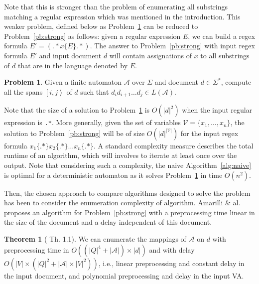 \documentclass[12px]{article}
\theoremstyle{definition}
\newtheorem{problem}{Problem}
\newtheorem{theorem}{Theorem}
\newcommand{\Span}[1]{\left[ #1 \right\rangle}
\begin{document}
      Note that this is stronger than the problem of enumerating all substrings
      matching a regular expression which was mentioned in the introduction.
      This weaker problem, defined below as Problem~\ref{pb:weak} can be
      reduced to Problem~\ref{pb:strong} as follows: given a regular expression
      $E$, we can build a regex formula $E' = ({.}* x\{E\} {.}*)$. The answer
      to Problem~\ref{pb:strong} with input regex formula $E'$ and input
      document $d$ will contain assignations of $x$ to all substrings of $d$
      that are in the language denoted by $E$.

      \begin{problem}%
        \label{pb:weak}
        Given a finite automaton $\mathcal{A}$ over $\Sigma$ and document $d
        \in \Sigma^*$, compute all the spans $\Span{i, j}$ of $d$ such that
        $d_i d_{i+1} \ldots d_j \in L(\mathcal{A})$.
      \end{problem}

      Note that the size of a solution to Problem~\ref{pb:weak} is $O(|d|^2)$
      when the input regular expression is \texttt{.*}. More generally, given
      the set of variables $\mathcal{V} = \{x_1, \ldots, x_n\}$, the solution
      to Problem~\ref{pb:strong} will be of size $O(|d|^{|\mathcal{V}|})$ for
      the input regex formula \texttt{$x_1\{.*\} x_2\{.*\} \ldots x_n\{.*\}$}.
      A standard complexity measure describes the total runtime of an
      algorithm, which will involves to iterate at least once over the output.
      Note that considering such a complexity, the naive
      Algorithm~\ref{alg:naive} is optimal for a deterministic automaton as it
      solves Problem~\ref{pb:weak} in time $O(n^2)$.

      Then, the chosen approach to compare algorithms designed to solve the
      problem has been to consider the enumeration complexity of algorithm.
      Amarilli \& al.~\cite{ICDT19} proposes an algorithm for
      Problem~\ref{pb:strong} with a preprocessing time linear in the size of
      the document and a delay independent of this document.

      \begin{theorem}[\cite{ICDT19} Th. 1.1]%
        \label{th:master}
        We can enumerate the mappings of $\mathcal{A}$ on $d$ with
        preprocessing time in $O((|Q|^4 + |\mathcal{A}|) \times |d|)$ and with
        delay $O(|V| \times (|Q|^2 + |\mathcal{A}| \times |V|^2))$, i.e.,
        linear preprocessing and constant delay in the input document, and
        polynomial preprocessing and delay in the input VA.
      \end{theorem}
\end{document}
